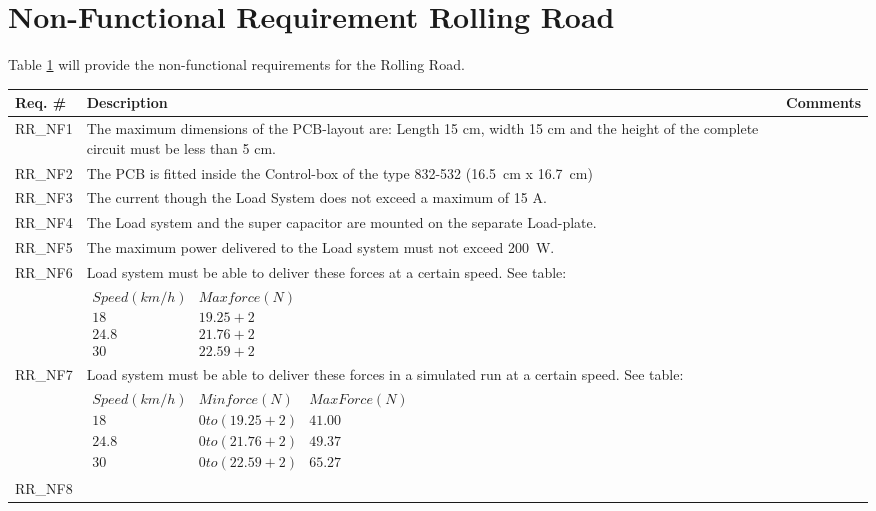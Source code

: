 \section{Non-Functional Requirement Rolling Road}
Table \ref{NFREQ_RR} will provide the non-functional requirements for the Rolling Road.

\begin{table}[h!]
	\label{NFREQ_RR}
	\centering
	\begin{tabular}{|p{2 cm}|p{10 cm}|p{2 cm}|}
		\hline
		\textbf{Req. \#} & \textbf{Description} & \textbf{Comments} \\\hline
		RR\_NF1
		& The maximum dimensions of the PCB-layout are: Length 15 cm, width 15 cm and the height of the complete circuit must be less than 5 cm. 
		&  \\ \hline
		RR\_NF2
		& The PCB is fitted inside the Control-box of the type 832-532 (\SI{16.5}{\centi \meter} x \SI{16.7}{\centi \meter})
		& \\ \hline
		RR\_NF3
		& The current though the Load System does not exceed a maximum of 15 A.
		& \\ \hline
		RR\_NF4
		& The Load system and the super capacitor are mounted on the separate Load-plate.
		& \\ \hline
		RR\_NF5
		& The maximum power delivered to the Load system must not exceed \SI{200}{\watt}.
		& \\ \hline
		RR\_NF6 
		& Load system must be able to deliver these forces at a certain speed. See table: 
		& \\ &
		$\begin{array}{c|c}
			Speed (km/h) & Max force (N) \\ 
			18 & 19.25+2 \\ 
			24.8 & 21.76+2 \\ 
			30 & 22.59+2
		\end{array} $
		& \\ \hline
		RR\_NF7
		& Load system must be able to deliver these forces in a simulated run at a certain speed. See table:
		& \\ &
		$\begin{array}{c|c|c}
			Speed (km/h) & Min force (N) & Max Force (N) \\ 
			18 & 0 to (19.25+2) & 41.00 \\ 
			24.8 & 0 to (21.76+2) & 49.37 \\ 
			30 & 0 to (22.59+2) & 65.27
		\end{array}$
		& \\ \hline
		RR\_NF8

\end{tabular}
\end{table}
